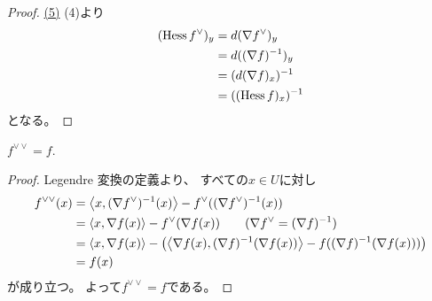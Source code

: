 \documentclass[report]{jlreq}
\begin{document}
\begin{proof}
    \uline{(5)} \quad
    (4)より
    \begin{alignat}{1}
        (\operatorname{Hess} f^\vee)_y
            &=
                d(\nabla f^\vee)_y
                \\
            &=
                d((\nabla f)^{-1})_y
                \\
            &=
                (d(\nabla f)_x)^{-1}
                \\
            &=
                ((\operatorname{Hess} f)_x)^{-1}
    \end{alignat}
    となる。
\end{proof}

\begin{corollary}
    $f^{\vee \vee} = f$.
\end{corollary}

\begin{proof}
    Legendre 変換の定義より、
    すべての$x \in U$に対し
    \begin{alignat}{1}
        f^{\vee\vee}(x)
            &=
                \left\langle{
                    x
                },{
                    (\nabla f^\vee)^{-1}
                    (x)
                }\right\rangle
                - f^\vee(
                    (\nabla f^\vee)^{-1}
                    (x)
                )
                \\
            &=
                \left\langle{
                    x
                },{
                    \nabla f
                    (x)
                }\right\rangle
                - f^\vee(
                    \nabla f
                    (x)
                )
                \qquad
                (\nabla f^\vee = (\nabla f)^{-1})
                \\
            &=
                \left\langle{
                    x
                },{
                    \nabla f
                    (x)
                }\right\rangle
                - \left({
                    \left\langle{
                        \nabla f
                        (x)
                    },{
                        (\nabla f)^{-1}(
                            \nabla f
                            (x)
                        )
                    }\right\rangle
                    - f(
                        (\nabla f)^{-1}(
                            \nabla f
                            (x)
                        )
                    )
                }\right)
                \\
            &=
                f(x)
    \end{alignat}
    が成り立つ。
    よって$f^{\vee\vee} = f$である。
\end{proof}
\end{document}
